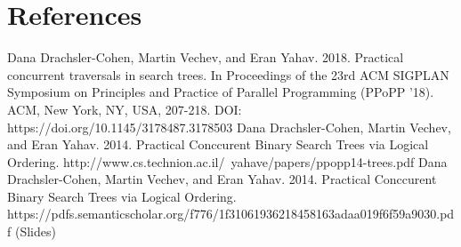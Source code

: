 \documentclass[conference]{IEEEtran}
\begin{document}
\section*{References}




\begin{thebibliography}{00}
 Dana Drachsler-Cohen, Martin Vechev, and Eran Yahav. 2018. Practical concurrent traversals in search trees. In Proceedings of the 23rd ACM SIGPLAN Symposium on Principles and Practice of Parallel Programming (PPoPP '18). ACM, New York, NY, USA, 207-218. DOI: https://doi.org/10.1145/3178487.3178503
 Dana Drachsler-Cohen, Martin Vechev, and Eran Yahav. 2014. Practical Conccurent Binary Search Trees via Logical Ordering. http://www.cs.technion.ac.il/~yahave/papers/ppopp14-trees.pdf
 Dana Drachsler-Cohen, Martin Vechev, and Eran Yahav. 2014. Practical Conccurent Binary Search Trees via Logical Ordering. https://pdfs.semanticscholar.org/f776/1f31061936218458163adaa019f6f59a9030.pdf (Slides)

\end{thebibliography}
\end{document}
